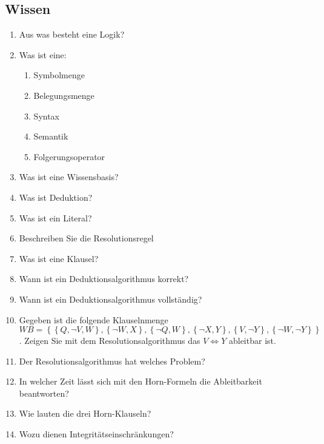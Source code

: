 \subsection{Wissen}
\begin{enumerate}
	\item Aus was besteht eine Logik?
	\item Was ist eine:
	\begin{enumerate}
		\item Symbolmenge
		\item Belegungsmenge
		\item Syntax
		\item Semantik
		\item Folgerungsoperator
	\end{enumerate}

  \item Was ist eine Wissensbasis?
	\item Was ist Deduktion?
	\item Was ist ein Literal?
	\item Beschreiben Sie die Resolutionsregel
	\item Was ist eine Klausel?
	\item Wann ist ein Deduktionsalgorithmus korrekt?
	\item Wann ist ein Deduktionsalgorithmus vollständig?
	
	\item Gegeben ist die folgende Klauselnmenge $WB=\left\{\left\{Q,\neg V,W\right\},\left\{\neg W,X\right\},\left\{\neg Q,W\right\},\left\{\neg X,Y\right\},\left\{V,\neg Y\right\},\left\{\neg W,\neg Y\right\}\right\}$. Zeigen Sie mit dem Resolutionsalgorithmus das $V\Leftrightarrow Y$ ableitbar ist.
	
	\item Der Resolutionsalgorithmus hat welches Problem?
	
	\item In welcher Zeit lässt sich mit den Horn-Formeln die Ableitbarkeit beantworten?
	
	\item Wie lauten die drei Horn-Klauseln?
	\item Wozu dienen Integritätseinschränkungen?
	

\end{enumerate}
